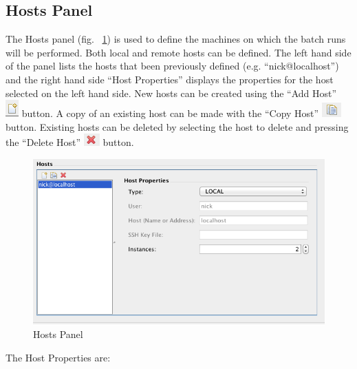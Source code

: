 \documentclass[11pt]{amsart}
\begin{document}
\subsection{Hosts Panel}
The Hosts panel (fig. ~\ref{fig:hosts_panel}) is used to define the machines on which the batch runs will be performed. Both local and remote hosts can be defined. The left hand side of the panel lists the hosts that been previously defined (e.g. ``nick@localhost'') and the right hand side ``Host Properties'' displays the properties for the host selected on the left hand side. New hosts can be created using the ``Add Host'' \includegraphics[height=.2in]{images/add_host.png} button. A copy of an existing host can be made with the ``Copy Host'' \includegraphics[height=.2in]{images/copy_host.png} button. Existing hosts can be deleted by selecting the host to delete and pressing the ``Delete Host'' \includegraphics[height=.2in]{images/delete_host.png} button.

\begin{figure}[h]
\begin{center}
\vspace{.2in}
\centerline {
\includegraphics[width=6in]{images/hosts_panel.png}
}
\caption{Hosts Panel}
\label{fig:hosts_panel}
\end{center}
\end{figure}

The Host Properties are:
\end{document}
